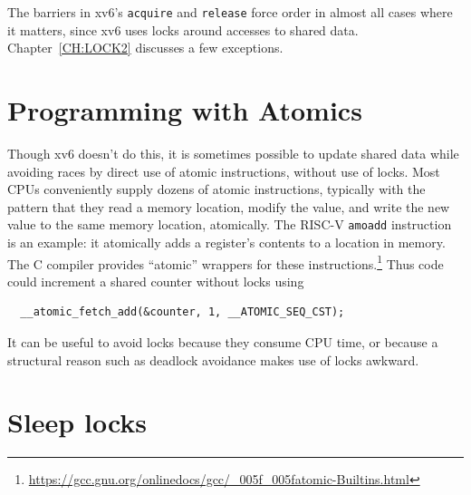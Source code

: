 The barriers in xv6's 
\lstinline{acquire}
and
\lstinline{release}
force order in almost all cases where it matters,
since xv6 uses locks around accesses to shared data.
Chapter~\ref{CH:LOCK2} discusses a few exceptions.

\section{Programming with Atomics}

Though xv6 doesn't do this, it is sometimes possible to update shared
data while avoiding races by direct use of atomic instructions,
without use of locks. Most CPUs conveniently supply dozens of atomic
instructions, typically with the pattern that they read a memory
location, modify the value, and write the new value to the same memory
location, atomically. The RISC-V \lstinline{amoadd} instruction is an
example: it atomically adds a register's contents to a location in
memory. The C compiler provides ``atomic'' wrappers for
these instructions.\footnote{\url{https://gcc.gnu.org/onlinedocs/gcc/_005f_005fatomic-Builtins.html}}
Thus code could increment a shared counter without locks using
\begin{lstlisting}
  __atomic_fetch_add(&counter, 1, __ATOMIC_SEQ_CST);
\end{lstlisting}
It can be useful to avoid locks because they consume
CPU time, or because a structural reason such as deadlock
avoidance makes use of locks awkward.

\section{Sleep locks}



